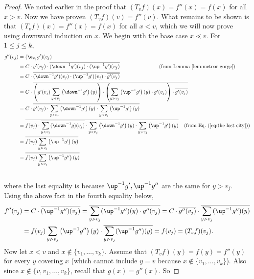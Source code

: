 \begin{proof}
We noted earlier in the proof that
$(T_v f)(x)=f''(x)=f(x)$ for all $x>v$. Now we have proven
$(T_v f)(v)=f''(v)$. What remains to be shown is that
$(T_v f)(x)=f''(x)=f(x)$ for all $x<v$, which we will now prove
using downward induction on $x$. We begin with the base case $x\lessdot v$. For $1\leq j\leq k$,
\begin{align*}
g''(v_j) &= (\e_{v_j}g')(v_j)\\
&=
C\cdot g'(v_j) \cdot \overline{(\down^{-1}g')(v_j)\cdot(\up^{-1}g')(v_j)}
\hspace{1.05 in}\text{(from Lemma~\ref{lem:meteor gorge})}
\\
&= C\cdot
\overline{(\down^{-1}g')(v_j)\cdot(\up^{-1}g')(v_j) \cdot
\overline{g'(v_j)}}
\\
&= C\cdot
\overline{\left(g'(v_j)\sum\limits_{y\lessdot v_j}\left(\down^{-1}g'\right)(y)\right)\cdot
\left(\sum\limits_{y\gtrdot v_j}\left(\up^{-1}g'\right)(y)\cdot g'(v_j)\right) \cdot
\overline{g'(v_j)}}
\\
&= C\cdot
\overline{g'(v_j)\cdot\sum\limits_{y\lessdot v_j}\left(\down^{-1}g'\right)(y)\cdot
\sum\limits_{y\gtrdot v_j}\left(\up^{-1}g'\right)(y)}
\\
&=
\overline{
f(v_j)\cdot\overline{\sum\limits_{y\lessdot v_j}(\down^{-1}g)(v_j)}
\cdot\sum\limits_{y\lessdot v_j}\left(\down^{-1}g'\right)(y)
\cdot\sum\limits_{y\gtrdot v_j}\left(\up^{-1}g'\right)(y)}
\hspace{0.15 in} \text{(from Eq.~(\ref{eq:the lost city}))}
\\
&=
\overline{
f(v_j)\sum\limits_{y\gtrdot v_j}\left(\up^{-1}g'\right)(y)}
\\
&=
\overline{
f(v_j)\sum\limits_{y\gtrdot v_j}\left(\up^{-1}g''\right)(y)}
\end{align*}\vspace{-0.1 in}\\
where the last equality is because $\up^{-1}g', \up^{-1}g''$ are the same for $y>v_j$.
Using the above fact in the fourth equality below,
\begin{align*}
f''(v_j)
&=C\cdot \overline{(\up^{-1}g'')(v_j)}
=\overline{\sum\limits_{y\gtrdot v_j}(\up^{-1}g'')(y)\cdot g''(v_j)}
= C\cdot 
\overline{g''(v_j)}\cdot \overline{\sum\limits_{y\gtrdot v_j}(\up^{-1}g'')(y)}\\
&=f(v_j)\sum\limits_{y\gtrdot v_j}\left(\up^{-1}g''\right)(y)\cdot \overline{\sum\limits_{y\gtrdot v_j}(\up^{-1}g'')(y)}
= f(v_j)=(T_v f)(v_j).
\end{align*}
Now let $x<v$ and $x\not\in\{v_1,\dots,v_k\}$.
Assume that $(T_v f)(y)=f(y)=f''(y)$ for every $y$ covering $x$ (which cannot include $y=v$ because $x\not\in\{v_1,\dots,v_k\}$).
Also since $x\not\in\{v,v_1,\dots,v_k\}$, recall that $g(x)=g''(x)$. So


\end{proof}
